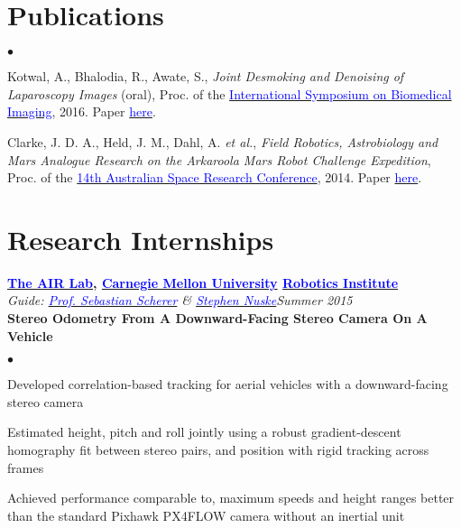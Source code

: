 \documentclass[margin,line]{res}
\newenvironment{list2}{
  \begin{list}{$\bullet$}{%
      \setlength{\itemsep}{0in}
      \setlength{\parsep}{0in} \setlength{\parskip}{0in}
      \setlength{\topsep}{0in} \setlength{\partopsep}{0in} 
      \setlength{\leftmargin}{0.2in}}}{\end{list}}
\begin{document}
\begin{resume}
\vspace*{-0.13in}

\section{\sc Publications}
\begin{list2}
\item Kotwal, A., Bhalodia, R., Awate, S., {\em Joint Desmoking and Denoising of Laparoscopy Images} (oral), Proc. of the \href{http://biomedicalimaging.org/2016/}{\textcolor{blue} {International Symposium on Biomedical Imaging}}, 2016. Paper \href{http://alankarkotwal.github.io/pubs/lap-dehazing.pdf}{\textcolor{blue} {here}}.
\item Clarke, J. D. A., Held, J. M., Dahl, A. {\em et al.}, {\em Field Robotics, Astrobiology and Mars Analogue Research on the Arkaroola Mars Robot Challenge Expedition}, Proc. of the \href{http://www.nssa.com.au/14asrc/14ASRC-proceedings.zip}{\textcolor{blue} {14th Australian Space Research Conference}}, 2014. Paper \href{http://alankarkotwal.github.io/pubs/Arkaroola.pdf}{\textcolor{blue} {here}}.
\end{list2}

\vspace*{-0.13in}

\section{\sc Research Internships} 

{\bf  \href{http://theairlab.org/}{\textcolor{blue}{The AIR Lab}}, \href{http://www.cmu.edu/}{\textcolor{blue}{Carnegie Mellon University}} \href{http://ri.cmu.edu/}{\textcolor{blue}{Robotics Institute}}} \\
{\em Guide: \href{http://www.ri.cmu.edu/person.html?person_id=1397}{\textcolor{blue}{Prof. Sebastian Scherer}} \& \href{http://www.ri.cmu.edu/person.html?person_id=2128}{\textcolor{blue} {Stephen Nuske}}}\hfill\textit{Summer 2015} \\
\vspace*{-.13in}
\textbf{Stereo Odometry From A Downward-Facing Stereo Camera On A Vehicle} \\
\vspace*{-.01in}
\begin{list2}
\item Developed correlation-based tracking for aerial vehicles with a downward-facing stereo camera
\item Estimated height, pitch and roll jointly using a robust gradient-descent homography fit between stereo pairs, and position with rigid tracking across frames
\item Achieved performance comparable to, maximum speeds and height ranges better than the standard Pixhawk PX4FLOW camera without an inertial unit
\end{list2}


\end{resume}
\end{document}
